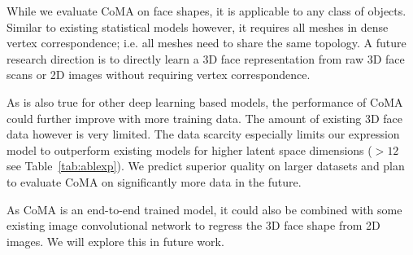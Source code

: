 While we evaluate CoMA on face shapes, it is applicable to any class of objects. Similar to existing statistical models however, it requires all meshes in dense vertex correspondence; i.e. all meshes need to share the same topology. A future research direction is to directly learn a 3D face representation from raw 3D face scans or 2D images without requiring vertex correspondence.

As is also true for other deep learning based models, the performance of CoMA could further improve with more training data. The amount of existing 3D face data however is very limited. The data scarcity especially limits our expression model to outperform existing models for higher latent space dimensions ($> 12$ see Table~\ref{tab:ablexp}). We predict superior quality on larger datasets and plan to evaluate CoMA on significantly more data in the future.

As CoMA is an end-to-end trained model, it could also be combined with some existing image convolutional network to regress the 3D face shape from 2D images. We will explore this in future work. 





